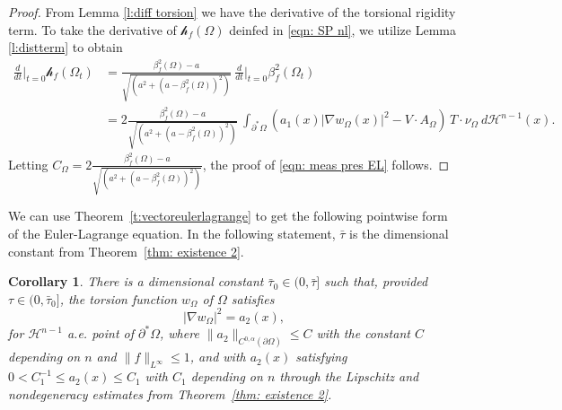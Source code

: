 \documentclass[10pt, reqno]{amsart}
\numberwithin{equation}{section}
\newtheorem{corollary}[theorem]{Corollary}
\def\W{\Omega}
\def\nl{\mathscr{h}_f}
\begin{document}
\begin{proof}
 From Lemma \ref{l:diff torsion} we have the derivative of the torsional rigidity term. To take the derivative of $\nl(\W)$ deinfed in \eqref{eqn: SP nl}, we utilize Lemma \ref{l:distterm} to obtain 
 \[
 \begin{aligned}
 \frac{d}{dt}\Bigr|_{t=0} \nl(\W_t)&= \frac{\beta^2_f(\W)-a}{\sqrt{(a^2+(a-\beta^2_f(\W))^2)}} \ \frac{d}{dt}\Bigr|_{t=0} \beta^2_f(\Omega_t) \\
 &=2 \frac{\beta^2_f(\W)-a}{\sqrt{(a^2+(a-\beta^2_f(\W))^2)}}
 \ \int_{\partial^* \W}  (a_1(x) |\nabla w_{\W}(x)|^2 - V \cdot A_{\W} )\, T \cdot \nu_{\W} \ d \mathcal{H}^{n-1}(x).
 \end{aligned}
 \]
  Letting $C_{\W} =2 \frac{\beta^2_f(\W)-a}{\sqrt{(a^2+(a-\beta^2_f(\W))^2)}}$, the proof  of \eqref{eqn: meas pres EL} follows. 
\end{proof}
We can use Theorem~\ref{t:vectoreulerlagrange} to get the following pointwise form of the Euler-Lagrange equation. In the following statement, $\bar{\tau}$ is the dimensional constant from Theorem~\ref{thm: existence 2}.
\begin{corollary} \label{c:pointeulerlagrange}
{There is a dimensional constant $\bar\tau_0\in (0, \bar{\tau}]$ such that, provided $\tau\in (0, \bar\tau_0]$,}  the torsion function $w_\W$ of $\W$ satisfies 
    \begin{equation} \label{e:rhsholder}
    |\nabla w_{\W}|^2=a_2(x),
    \end{equation}
    for $\mathcal{H}^{n-1}$ a.e. point of $\partial^* \W$,
    where $\|a_2\|_{C^{0,\alpha}(\partial \W)} \leq C$  with the constant $C$ depending on $n$ and $\| f\|_{L^{\infty}} \leq 1$, and with $a_2(x)$ satisfying $0< C_1^{-1} \leq a_2(x) \leq C_1$ with $C_1$ depending on $n$ through the Lipschitz and nondegeneracy estimates from Theorem~\ref{thm: existence 2}.   
\end{corollary}
\end{document}
